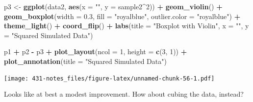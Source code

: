 \documentclass[
]{book}
\newenvironment{Shaded}{\begin{snugshade}}{\end{snugshade}}
\newcommand{\DataTypeTok}[1]{\textcolor[rgb]{0.13,0.29,0.53}{#1}}
\newcommand{\DecValTok}[1]{\textcolor[rgb]{0.00,0.00,0.81}{#1}}
\newcommand{\FloatTok}[1]{\textcolor[rgb]{0.00,0.00,0.81}{#1}}
\newcommand{\KeywordTok}[1]{\textcolor[rgb]{0.13,0.29,0.53}{\textbf{#1}}}
\newcommand{\NormalTok}[1]{#1}
\newcommand{\OperatorTok}[1]{\textcolor[rgb]{0.81,0.36,0.00}{\textbf{#1}}}
\newcommand{\StringTok}[1]{\textcolor[rgb]{0.31,0.60,0.02}{#1}}
\begin{document}
\begin{Shaded}
\begin{Highlighting}[]
\NormalTok{p3 <-}\StringTok{ }\KeywordTok{ggplot}\NormalTok{(data2, }\KeywordTok{aes}\NormalTok{(}\DataTypeTok{x =} \StringTok{""}\NormalTok{, }\DataTypeTok{y =}\NormalTok{ sample2}\OperatorTok{^}\DecValTok{2}\NormalTok{)) }\OperatorTok{+}
\StringTok{    }\KeywordTok{geom_violin}\NormalTok{() }\OperatorTok{+}
\StringTok{    }\KeywordTok{geom_boxplot}\NormalTok{(}\DataTypeTok{width =} \FloatTok{0.3}\NormalTok{, }\DataTypeTok{fill =} \StringTok{"royalblue"}\NormalTok{, }
                 \DataTypeTok{outlier.color =} \StringTok{"royalblue"}\NormalTok{) }\OperatorTok{+}
\StringTok{    }\KeywordTok{theme_light}\NormalTok{() }\OperatorTok{+}
\StringTok{    }\KeywordTok{coord_flip}\NormalTok{() }\OperatorTok{+}
\StringTok{    }\KeywordTok{labs}\NormalTok{(}\DataTypeTok{title =} \StringTok{"Boxplot with Violin"}\NormalTok{,}
         \DataTypeTok{x =} \StringTok{""}\NormalTok{, }\DataTypeTok{y =} \StringTok{"Squared Simulated Data"}\NormalTok{)}

\NormalTok{p1 }\OperatorTok{+}\StringTok{ }\NormalTok{p2 }\OperatorTok{-}\StringTok{ }\NormalTok{p3 }\OperatorTok{+}\StringTok{ }\KeywordTok{plot_layout}\NormalTok{(}\DataTypeTok{ncol =} \DecValTok{1}\NormalTok{, }\DataTypeTok{height =} \KeywordTok{c}\NormalTok{(}\DecValTok{3}\NormalTok{, }\DecValTok{1}\NormalTok{)) }\OperatorTok{+}
\StringTok{    }\KeywordTok{plot_annotation}\NormalTok{(}\DataTypeTok{title =} \StringTok{"Squared Simulated Data"}\NormalTok{)}
\end{Highlighting}
\end{Shaded}

\texttt{[image: 431-notes\_files/figure-latex/unnamed-chunk-56-1.pdf]}

Looks like at best a modest improvement. How about cubing the data, instead?
\end{document}
